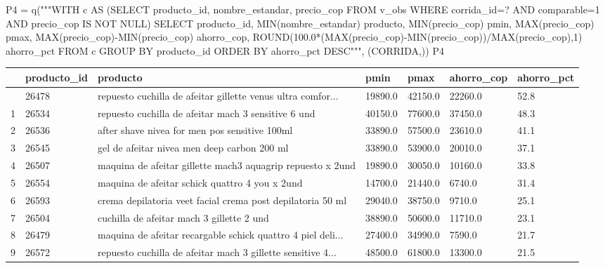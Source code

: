 \documentclass[
  spanish,
  letterpaper,
  DIV=11,
  numbers=noendperiod]{scrartcl}
\newenvironment{Shaded}{\begin{snugshade}}{\end{snugshade}}
\newcommand{\NormalTok}[1]{\textcolor[rgb]{0.00,0.23,0.31}{#1}}
\newcommand{\OperatorTok}[1]{\textcolor[rgb]{0.37,0.37,0.37}{#1}}
\newcommand{\StringTok}[1]{\textcolor[rgb]{0.13,0.47,0.30}{#1}}
\newcounter{none} %
\begin{document}
\begin{Shaded}
\begin{Highlighting}[]
\NormalTok{P4 }\OperatorTok{=}\NormalTok{ q(}\StringTok{"""WITH c AS (SELECT producto\_id, nombre\_estandar, precio\_cop FROM v\_obs}
\StringTok{  WHERE corrida\_id=? AND comparable=1 AND precio\_cop IS NOT NULL)}
\StringTok{SELECT producto\_id, MIN(nombre\_estandar) producto, MIN(precio\_cop) pmin, MAX(precio\_cop) pmax,}
\StringTok{ MAX(precio\_cop){-}MIN(precio\_cop) ahorro\_cop, ROUND(100.0*(MAX(precio\_cop){-}MIN(precio\_cop))/MAX(precio\_cop),1) ahorro\_pct}
\StringTok{FROM c GROUP BY producto\_id ORDER BY ahorro\_pct DESC"""}\NormalTok{, (CORRIDA,))}
\NormalTok{P4}
\end{Highlighting}
\end{Shaded}

{\def\LTcaptype{none} %
\begin{longtable}[]{@{}lllllll@{}}
\toprule\noalign{}
& producto\_id & producto & pmin & pmax & ahorro\_cop & ahorro\_pct \\
\midrule\noalign{}
\endhead
\bottomrule\noalign{}
\endlastfoot
0 & 26478 & repuesto cuchilla de afeitar gillette venus ultra comfor...
& 19890.0 & 42150.0 & 22260.0 & 52.8 \\
1 & 26534 & repuesto cuchilla de afeitar mach 3 sensitive 6 und &
40150.0 & 77600.0 & 37450.0 & 48.3 \\
2 & 26536 & after shave nivea for men pos sensitive 100ml & 33890.0 &
57500.0 & 23610.0 & 41.1 \\
3 & 26545 & gel de afeitar nivea men deep carbon 200 ml & 33890.0 &
53900.0 & 20010.0 & 37.1 \\
4 & 26507 & maquina de afeitar gillette mach3 aquagrip repuesto x 2und &
19890.0 & 30050.0 & 10160.0 & 33.8 \\
5 & 26554 & maquina de afeitar schick quattro 4 you x 2und & 14700.0 &
21440.0 & 6740.0 & 31.4 \\
6 & 26593 & crema depilatoria veet facial crema post depilatoria 50 ml &
29040.0 & 38750.0 & 9710.0 & 25.1 \\
7 & 26504 & cuchilla de afeitar mach 3 gillette 2 und & 38890.0 &
50600.0 & 11710.0 & 23.1 \\
8 & 26479 & maquina de afeitar recargable schick quattro 4 piel deli...
& 27400.0 & 34990.0 & 7590.0 & 21.7 \\
9 & 26572 & repuesto cuchilla de afeitar mach 3 gillette sensitive 4...
& 48500.0 & 61800.0 & 13300.0 & 21.5 \\

\end{longtable}}
\end{document}

